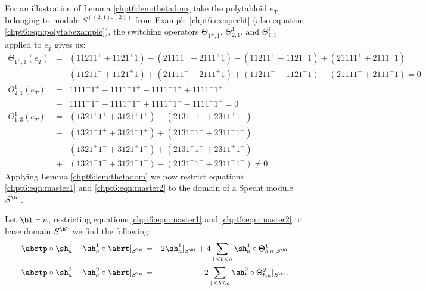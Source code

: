 \documentclass[11pt]{report}
\begin{document}
For an illustration of Lemma \ref{chpt6:lem:thetadom} take the polytabloid $e_{\overline{T}}$ belonging to module $S^{((2,1),(2))}$ from Example \ref{chpt6:ex:specht} (also equation \eqref{chpt6:eqn:polytabexample}), the switching operators $\Theta_{1^{\pm},1}$, $\Theta_{2,1}^{1}$, and $\Theta_{1,3}^{1}$ applied to $e_{\overline{T}}$ gives us:
\begin{eqnarray}
\Theta_{1^{\pm},1} (e_{\overline{T}})& = & (11211^{+} + 1121^{+}1) - (21111^{+} + 2111^{+}1) - (11211^{+} + 1121^{-}1) + (21111^{+} + 2111^{-}1) \nonumber \\
& - &  (11211^{-} + 1121^{+}1) +  (21111^{-} + 2111^{+}1)  +  (11211^{-} + 1121^{-}1) -  (21111^{-} + 2111^{-}1) = 0 \nonumber \\ 
\Theta_{2,1}^{1} (e_{\overline{T}}) & = & 1111^{+}1^{+} - 1111^{+}1^{+} - 1111^{-}1^{+} + 1111^{-}1^{+}
\nonumber\\
& - & 1111^{+}1^{-} + 1111^{+}1^{-} + 1111^{-}1^{-} - 1111^{-}1^{-} = 0 \nonumber\\
\Theta_{1,3}^{1} (e_{\overline{T}}) & = & (1321^{+}1^{+} + 3121^{+}1^{+}) - (2131^{+}1^{+} + 2311^{+}1^{+})  \nonumber \\ 
& - & ( 1321^{-}1^{+} + 3121^{-}1^{+})+ (2131^{-}1^{+} + 2311^{-}1^{+})  \nonumber \\
& - &  ( 1321^{+}1^{-} + 3121^{+}1^{-}) + (2131^{+}1^{-} + 2311^{+}1^{-})  \nonumber \\
& + & ( 1321^{-}1^{-} + 3121^{-}1^{-}) - (2131^{-}1^{-} + 2311^{-}1^{-}) \neq 0 \nonumber.
\end{eqnarray}
Applying Lemma \ref{chpt6:lem:thetadom} we now restrict equations \eqref{chpt6:eqn:master1} and \eqref{chpt6:eqn:master2} to the domain of a Specht module $S^{\bl}$.
		
\begin{corollary}
	\label{chpt6:cor:restrict}
	Let $\bl \vdash n$, restricting equations 
	\eqref{chpt6:eqn:master1} and \eqref{chpt6:eqn:master2} to have domain 
	$S^{\bl}$ we find the following: 
	\begin{eqnarray}
	\abrtp \circ \sh_{a}^{1} - \sh_{a}^{1} \circ 
	\abrt |_{S^{\bl}} & = &2\sh_{a}^{1}|_{S^{\bl}}   +  
	4  \sum_{1 \leq b \leq a} 
	\sh_{b}^{1}\circ\Theta_{b,a}^{1} |_{S^{\bl}}  
	\label{chpt6:eqn:masterres1}\\
	\abrtp \circ \sh_{a}^{2} - \sh_{a}^{2} \circ 
	\abrt |_{S^{\bl}}  & = & 2 \sum_{1 \leq b \leq a}
	\sh_{b}^{2}\circ  \Theta_{b,a}^{2} |_{S^{\bl}}  .
	\label{chpt6:eqn:masterres2}
	\end{eqnarray}
	
	
	
	
	
	
	
	
	
	
	
\end{corollary}
\end{document}
